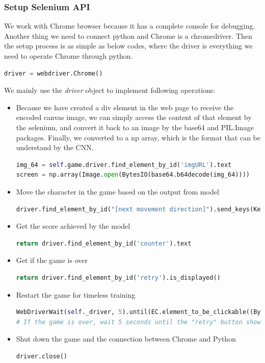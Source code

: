 \documentclass{article}
\begin{document}
\subsubsection{Setup Selenium API}
We work with Chrome browser because it has a complete console for debugging. Another thing we need to connect python and Chrome is a chromedriver. Then the setup process is as simple as below codes, where the driver is everything we need to operate Chrome through python.
\begin{lstlisting}[language=Python]
    driver = webdriver.Chrome()
\end{lstlisting}

We mainly use the \textit{driver} object to implement following operations:

\begin{itemize}
  \item Because we have created a div element in the web page to receive the encoded canvas image, we can simply access the content of that element by the selenium, and convert it back to an image by the base64 and PIL.Image packages. Finally, we converted to a np array, which is the format that can be understand by the CNN.
  \begin{lstlisting}[language=Python]
img_64 = self.game.driver.find_element_by_id('imgURL').text  
screen = np.array(Image.open(BytesIO(base64.b64decode(img_64))))
    \end{lstlisting}
  \item Move the character in the game based on the output from model
  \begin{lstlisting}[language=Python]
driver.find_element_by_id("[next movement direction]").send_keys(Keys.[Direction])
    \end{lstlisting}
    \item Get the score achieved by the model
    \begin{lstlisting}[language=Python]
return driver.find_element_by_id('counter').text
    \end{lstlisting}
    \item Get if the game is over
    \begin{lstlisting}[language=Python]
return driver.find_element_by_id('retry').is_displayed()
    \end{lstlisting}
    \item Restart the game for timeless training
    \begin{lstlisting}[language=Python]
WebDriverWait(self._driver, 5).until(EC.element_to_be_clickable((By.ID, "retry"))).click()
# If the game is over, wait 5 seconds until the "retry" button shown up and available to be clicked
    \end{lstlisting}
    \item Shut down the game and the connection between Chrome and Python
    \begin{lstlisting}[language=Python]
driver.close()
    \end{lstlisting}
\end{itemize}
\end{document}
